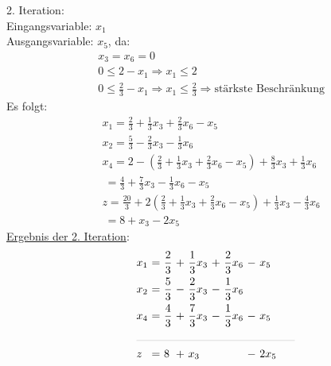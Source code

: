 \documentclass [a4paper,11pt]{article}
\begin{document}
\begin{enumerate}
\begin{enumerate}
                2. Iteration:\\
                Eingangsvariable: $x_1$\\
                Ausgangsvariable: $x_5$, da:
                \begin{align*}
                    &x_3 = x_6 = 0\\
                    & 0 \leq 2 - x_1 \Rightarrow x_1 \leq 2 \\
                    & 0 \leq \frac{2}{3} - x_1 \Rightarrow x_1 \leq \frac{2}{3} \Rightarrow \text{stärkste Beschränkung}
                \end{align*}
                Es folgt:
                \begin{align*}
                & x_1 = \frac{2}{3} + \frac{1}{3}x_3 + \frac{2}{3}x_6 - x_5\\
                & x_2 = \frac{5}{3} - \frac{2}{3}x_3 - \frac{1}{3}x_6\\
                & x_4 = 2 - \left( \frac{2}{3} + \frac{1}{3}x_3 + \frac{2}{3}x_6 - x_5 \right) + \frac{8}{3}x_3 + \frac{1}{3}x_6\\
                &   \ = \frac{4}{3} +\frac{7}{3}x_3 - \frac{1}{3}x_6 - x_5\\
                &   z = \frac{20}{3} + 2 \left( \frac{2}{3} + \frac{1}{3}x_3 + \frac{2}{3}x_6 - x_5 \right) + \frac{1}{3}x_3 - \frac{4}{3}x_6\\
                &   \ = 8 + x_3 - 2x_5
                \end{align*}
                \underline{Ergebnis der 2. Iteration}:
                \begin{align*}
                \begin{alignedat}{6}
                & x_1 &\ = &\ \frac{2}{3}  &\ + &\ \frac{1}{3}x_3 &\ + &\ \frac{2}{3}x_6 &\ - &\ x_5 \\
                & x_2 &\ = &\ \frac{5}{3}  &\ - &\ \frac{2}{3}x_3 &\ - &\ \frac{1}{3}x_6 &    & \\
                & x_4 &\ = &\ \frac{4}{3}  &\ + &\ \frac{7}{3}x_3 &\ - &\ \frac{1}{3}x_6 &\ - &\ x_5 \\
                &\rlap{\rule{5cm}{.1pt}} &&&&&&&&\\
                & z   &\ = &\ 8 &\ + &\ x_3 & & &\ - &\ 2x_5
                \end{alignedat}
                \end{align*}


\end{enumerate}
\end{enumerate}
\end{document}
